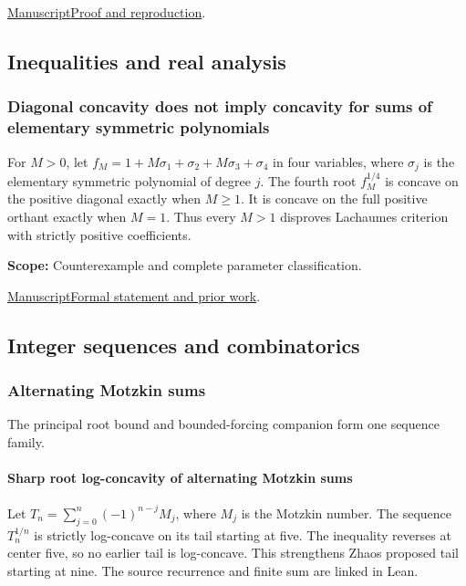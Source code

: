 \documentclass[11pt,a4paper]{article}
\begin{document}
\noindent\href{https://github.com/dvgyl/math-and-theory/blob/main/papers/mathematics/harmonic-boundary-five/manuscript.pdf}{Manuscript}\quad\href{https://github.com/dvgyl/math-and-theory/blob/main/papers/mathematics/harmonic-boundary-five/README.md}{Proof and reproduction}.

\subsection{Inequalities and real analysis}

\subsubsection{Diagonal concavity does not imply concavity for sums of elementary symmetric polynomials}

For $M>0$, let $f_M=1+M\sigma_1+\sigma_2+M\sigma_3+\sigma_4$ in four variables, where $\sigma_j$ is the elementary symmetric polynomial of degree $j$. The fourth root $f_M^{1/4}$ is concave on the positive diagonal exactly when $M\geq1$. It is concave on the full positive orthant exactly when $M=1$. Thus every $M>1$ disproves Lachaume\textquotesingle s criterion with strictly positive coefficients.

\par\smallskip

\noindent\textbf{Scope:} Counterexample and complete parameter classification.

\par\smallskip

\noindent\href{https://github.com/dvgyl/math-and-theory/blob/main/papers/mathematics/diagonal-concavity/paper.pdf}{Manuscript}\quad\href{https://github.com/dvgyl/math-and-theory/blob/main/lean/docs/mathematics/diagonal-concavity.md}{Formal statement and prior work}.

\subsection{Integer sequences and combinatorics}

\subsubsection{Alternating Motzkin sums}

The principal root bound and bounded-forcing companion form one sequence family.

\paragraph{Sharp root log-concavity of alternating Motzkin sums} Let $T_n=\sum_{j=0}^n(-1)^{n-j}M_j$, where $M_j$ is the Motzkin number. The sequence $T_n^{1/n}$ is strictly log-concave on its tail starting at five. The inequality reverses at center five, so no earlier tail is log-concave. This strengthens Zhao\textquotesingle s proposed tail starting at nine. The source recurrence and finite sum are linked in Lean.
\end{document}
